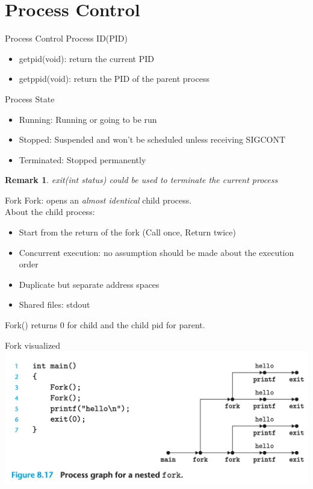 \documentclass{beamer}
\newtheorem{rmk}{Remark}
\begin{document}
    \section{Process Control}
    \begin{frame}{Process Control}
        Process ID(PID)
        \begin{itemize}
            \item getpid(void): return the current PID
            \item getppid(void): return the PID of the parent process
        \end{itemize}
    \end{frame}
    \begin{frame}{Process State}
        \begin{itemize}
            \item Running: Running or going to be run
            \item Stopped: Suspended and won't be scheduled unless receiving SIGCONT
            \item Terminated: Stopped permanently
        \end{itemize}
        \begin{rmk}
            \emph{exit(int status)} could be used to terminate the current process 
        \end{rmk}
    \end{frame}
    \begin{frame}{Fork}
        Fork: opens an \emph{almost identical} child process.\\
        About the child process:
        \begin{itemize}
            \item Start from the return of the fork (Call once, Return twice)
            \item Concurrent execution: no assumption should be made about the execution order
            \item Duplicate but separate address spaces
            \item Shared files: stdout
        \end{itemize}
        Fork() returns 0 for child and the child pid for parent.
    \end{frame}
    \begin{frame}{Fork visualized}
        \includegraphics[width=\textwidth]{forkvisualized.png}
    \end{frame}
\end{document}
